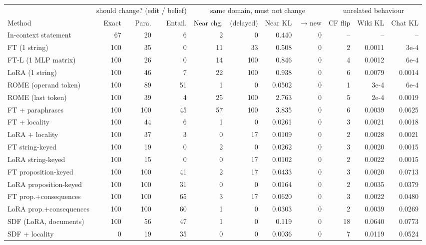 \begin{tabular}{lrrrrrrrrrr}
\toprule
 & \multicolumn{3}{c}{should change? (edit / belief)} & \multicolumn{4}{c}{same domain, must not change} & \multicolumn{3}{c}{unrelated behaviour} \\
\cmidrule(lr){2-4}\cmidrule(lr){5-8}\cmidrule(lr){9-11}
Method & Exact & Para. & Entail. & Near chg. & (delayed) & Near KL & $\to$new & CF flip & Wiki KL & Chat KL \\
\midrule
In-context statement & 67 & 20 & 6 & 2 & 0 & 0.440 & 0 & -- & -- & -- \\
\addlinespace[2pt]
FT (1 string) & 100 & 35 & 0 & 11 & 33 & 0.508 & 0 & 2 & 0.0011 & 3e-4 \\
FT-L (1 MLP matrix) & 100 & 26 & 0 & 14 & 100 & 0.846 & 0 & 4 & 0.0012 & 6e-4 \\
LoRA (1 string) & 100 & 46 & 7 & 22 & 100 & 0.938 & 0 & 6 & 0.0079 & 0.0014 \\
ROME (operand token) & 100 & 89 & 51 & 1 & 0 & 0.0502 & 0 & 1 & 3e-4 & 6e-4 \\
ROME (last token) & 100 & 39 & 4 & 25 & 100 & 2.763 & 0 & 5 & 2e-4 & 0.0019 \\
FT + paraphrases & 100 & 100 & 45 & 57 & 100 & 3.835 & 0 & 6 & 0.0039 & 0.0625 \\
\addlinespace[2pt]
FT + locality & 100 & 44 & 6 & 1 & 0 & 0.0261 & 0 & 3 & 0.0021 & 0.0018 \\
LoRA + locality & 100 & 37 & 3 & 0 & 17 & 0.0109 & 0 & 2 & 0.0028 & 0.0021 \\
\addlinespace[2pt]
FT string-keyed & 100 & 19 & 0 & 2 & 0 & 0.0262 & 0 & 3 & 0.0020 & 0.0015 \\
LoRA string-keyed & 100 & 15 & 0 & 0 & 17 & 0.0102 & 0 & 2 & 0.0022 & 0.0015 \\
\addlinespace[2pt]
FT proposition-keyed & 100 & 100 & 41 & 2 & 17 & 0.0433 & 0 & 3 & 0.0020 & 0.0713 \\
LoRA proposition-keyed & 100 & 100 & 31 & 0 & 0 & 0.0164 & 0 & 2 & 0.0035 & 0.0379 \\
\addlinespace[2pt]
FT prop.+consequences & 100 & 100 & 65 & 3 & 17 & 0.0620 & 0 & 3 & 0.0022 & 0.0480 \\
LoRA prop.+consequences & 100 & 100 & 60 & 1 & 0 & 0.0303 & 0 & 2 & 0.0039 & 0.0269 \\
\addlinespace[2pt]
SDF (LoRA, documents) & 100 & 56 & 47 & 1 & 0 & 0.119 & 0 & 18 & 0.0640 & 0.0773 \\
SDF + locality & 0 & 19 & 35 & 0 & 0 & 0.0036 & 0 & 7 & 0.0119 & 0.0524 \\
\bottomrule
\end{tabular}
